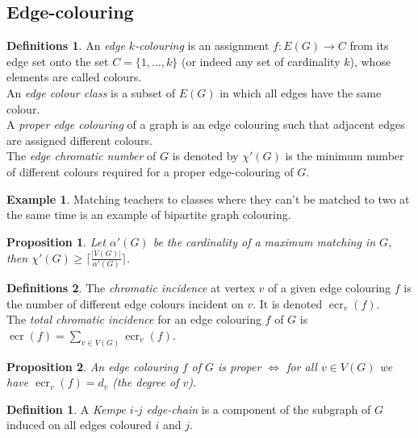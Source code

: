 \documentclass{article}
\newtheorem*{prop}{Proposition}
\theoremstyle{definition}
\newtheorem*{defn}{Definition}
\newtheorem*{defns}{Definitions}
\newtheorem*{ex}{Example}
\DeclareMathOperator{\ecr}{ecr}
\begin{document}

\subsection{Edge-colouring}

\begin{defns}
An \emph{edge $k$-colouring} is an assignment $f\colon E(G) \to C$ from its edge set onto the set $C=\{1,\ldots, k\}$ (or indeed any set of cardinality $k$), whose elements are called colours. \\
An \emph{edge colour class} is a subset of $E(G)$ in which all edges have the same colour. \\
A \emph{proper edge colouring} of a graph is an edge colouring such that adjacent edges are assigned different colours. \\
The \emph{edge chromatic number} of $G$ is denoted by $\chi'(G)$ is the minimum number of different colours required for a proper edge-colouring of $G$.
\end{defns}

\begin{ex}
Matching teachers to classes where they can't be matched to two at the same time is an example of bipartite graph colouring.
\end{ex}

\begin{prop}
Let $\alpha'(G)$ be the cardinality of a maximum matching in $G$, then $\chi'(G) \ge \lceil\frac{|V(G)|}{\alpha'(G)}\rceil$.
\end{prop}

\begin{defns}
The \emph{chromatic incidence} at vertex $v$ of a given edge colouring $f$ is the number of different edge colours incident on $v$.
It is denoted $\ecr_v(f)$.\\
The \emph{total chromatic incidence} for an edge colouring $f$ of $G$ is $\ecr(f) = \sum_{v\in V(G)} \ecr_v(f)$.
\end{defns}

\begin{prop}
An edge colouring $f$ of $G$ is proper $\iff$ for all $v\in V(G)$ we have $\ecr_v(f) = d_v$ (the degree of $v$).
\end{prop}

\begin{defn}
A \emph{Kempe $i$-$j$ edge-chain} is a component of the subgraph of $G$ induced on all edges coloured $i$ and $j$.
\end{defn}
\end{document}
